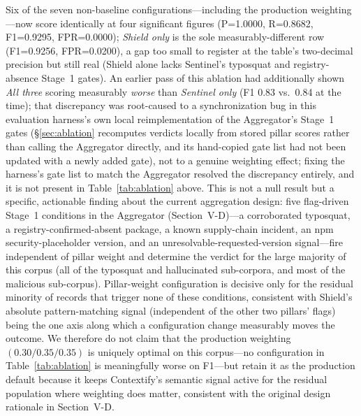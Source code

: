\documentclass[journal]{IEEEtran}
\begin{document}
Six of the seven non-baseline configurations---including the production weighting---now score identically at
four significant figures (P=1.0000, R=0.8682, F1=0.9295, FPR=0.0000); \emph{Shield only} is the sole
measurably-different row (F1=0.9256, FPR=0.0200), a gap too small to register at the table's two-decimal
precision but still real (Shield alone lacks Sentinel's typosquat and registry-absence Stage~1 gates). An
earlier pass of this ablation had additionally shown \emph{All three} scoring measurably \emph{worse} than
\emph{Sentinel only} (F1 0.83 vs.\ 0.84 at the time); that discrepancy was root-caused to a synchronization
bug in this evaluation harness's own local reimplementation of the Aggregator's Stage~1 gates (\S\ref{sec:ablation}
recomputes verdicts locally from stored pillar scores rather than calling the Aggregator directly, and its
hand-copied gate list had not been updated with a newly added gate), not to a genuine weighting effect; fixing
the harness's gate list to match the Aggregator resolved the discrepancy entirely, and it is not present in
Table~\ref{tab:ablation} above. This is not a null result but a specific, actionable finding about the current
aggregation design: five flag-driven Stage~1 conditions in the Aggregator (Section~V-D)---a corroborated
typosquat, a registry-confirmed-absent package, a known supply-chain incident, an npm security-placeholder
version, and an unresolvable-requested-version signal---fire independent of pillar weight and determine the
verdict for the large majority of this corpus (all of the typosquat and hallucinated sub-corpora, and most of
the malicious sub-corpus). Pillar-weight configuration is decisive only for the residual minority of records
that trigger none of these conditions,
consistent with Shield's absolute pattern-matching signal (independent of the other two pillars' flags) being
the one axis along which a configuration change measurably moves the outcome. We therefore do not claim that
the production weighting $(0.30/0.35/0.35)$ is uniquely optimal on this corpus---no configuration in
Table~\ref{tab:ablation} is meaningfully worse on F1---but retain it as the production default because it keeps
Contextify's semantic signal active for the residual population where weighting does matter, consistent with
the original design rationale in Section~V-D.
\end{document}

